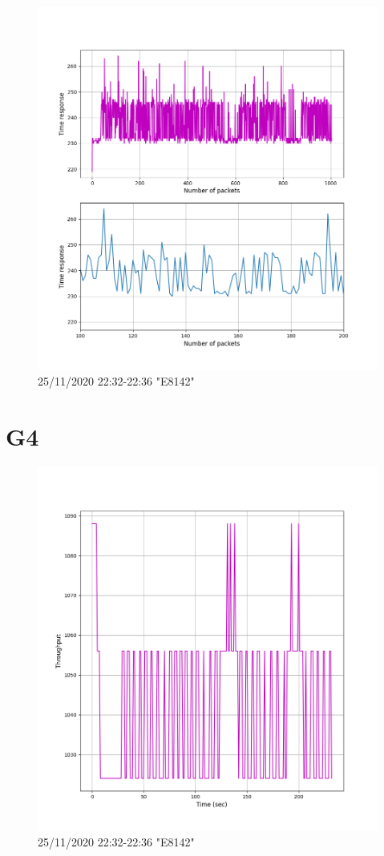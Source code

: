 \documentclass[hidelinks, 12pt, a4paper]{article}
\begin{document}
\begin{figure}[h!]
\centering
	\includegraphics[height=.38\textheight, width=\textwidth]{assets/session1/g3.png}
    \caption{25/11/2020 22:32-22:36 "E8142"} 
\end{figure}

\section{G4}

\begin{figure}[h!]
\centering
	\includegraphics[height=.38\textheight, width=\textwidth]{assets/session1/g4.png}
    \caption{25/11/2020 22:32-22:36 "E8142"} 
\end{figure}
\end{document}
